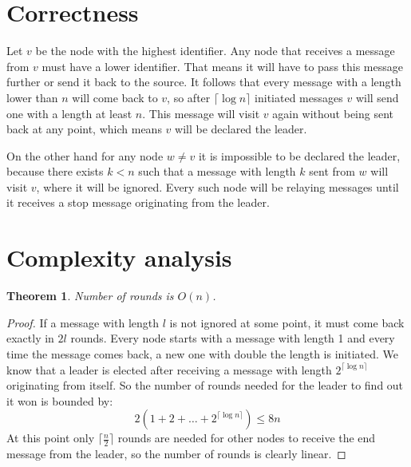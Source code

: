 \documentclass[a4paper,12pt]{article}
\newtheorem{theorem}{Theorem}
\begin{document}
\section{Correctness}
Let $v$ be the node with the highest identifier. Any node that receives a message from $v$ must have a lower identifier. That means it will have to pass this message further or send it back to the source. It follows that every message with a length lower than $n$ will come back to $v$, so after $\lceil\log n\rceil$ initiated messages $v$ will send one with a length at least $n$. This message will visit $v$ again without being sent back at any point, which means $v$ will be declared the leader.\par
On the other hand for any node $w\neq v$ it is impossible to be declared the leader, because there exists $k<n$ such that a message with length $k$ sent from $w$ will visit $v$, where it will be ignored. Every such node will be relaying messages until it receives a stop message originating from the leader.

\section{Complexity analysis}
\begin{theorem}
Number of rounds is $O(n)$.
\end{theorem}
\begin{proof}
If a message with length $l$ is not ignored at some point, it must come back exactly in $2l$ rounds. Every node starts with a message with length 1 and every time the message comes back, a new one with double the length is initiated. We know that a leader is elected after receiving a message with length $2^{\lceil\log n\rceil}$ originating from itself. So the number of rounds needed for the leader to find out it won is bounded by:
$$2(1+2+\dots+2^{\lceil\log n\rceil})\leqslant 8n$$
At this point only $\lceil\frac{n}{2}\rceil$ rounds are needed for other nodes to receive the end message from the leader, so the number of rounds is clearly linear.
\end{proof}
\end{document}

